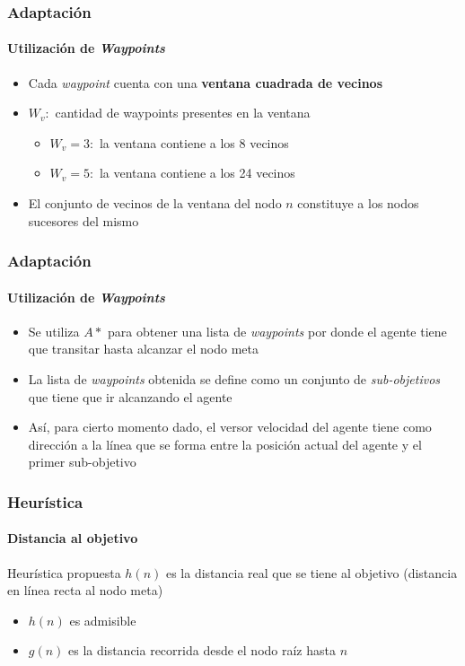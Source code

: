 \documentclass[hyperref={pdfpagelayout=SinglePage}]{beamer}
\begin{document}
\begin{frame}
\frametitle{Adaptación}
\framesubtitle{Utilización de \textit{Waypoints}}
\begin{itemize}
	\item Cada \textit{waypoint} cuenta con una \textbf{ventana cuadrada de vecinos}
	\item $W_{v} :$ cantidad de waypoints presentes en la ventana
	\begin{itemize}
		\item $W_{v} = 3 :$ la ventana contiene a los 8 vecinos
		\item $W_{v} = 5 :$ la ventana contiene a los 24 vecinos
	\end{itemize}
	\item El conjunto de vecinos de la ventana del nodo $n$ constituye a los nodos sucesores del mismo
\end{itemize}
\end{frame}

\begin{frame}
\frametitle{Adaptación}
\framesubtitle{Utilización de \textit{Waypoints}}
\begin{itemize}
	\item Se utiliza $A*$ para obtener una lista de \textit{waypoints} por donde el agente tiene que transitar hasta alcanzar el nodo meta
	\item La lista de \textit{waypoints} obtenida se define como un conjunto de \textit{sub-objetivos} que tiene que ir alcanzando el agente
	\item Así, para cierto momento dado, el versor velocidad del agente tiene como dirección a la línea que se forma entre la posición actual del agente y el primer sub-objetivo
\end{itemize}
\end{frame}

\begin{frame}
\frametitle{Heurística}
\framesubtitle{Distancia al objetivo}
\begin{block}{Heurística propuesta}
$h(n)$ es la distancia real que se tiene al objetivo (distancia en línea recta al nodo meta)
\end{block}
\begin{itemize}
	\item $h(n)$ es admisible
	\item $g(n)$ es la distancia recorrida desde el nodo raíz hasta $n$
\end{itemize}
\end{frame}
\end{document}
